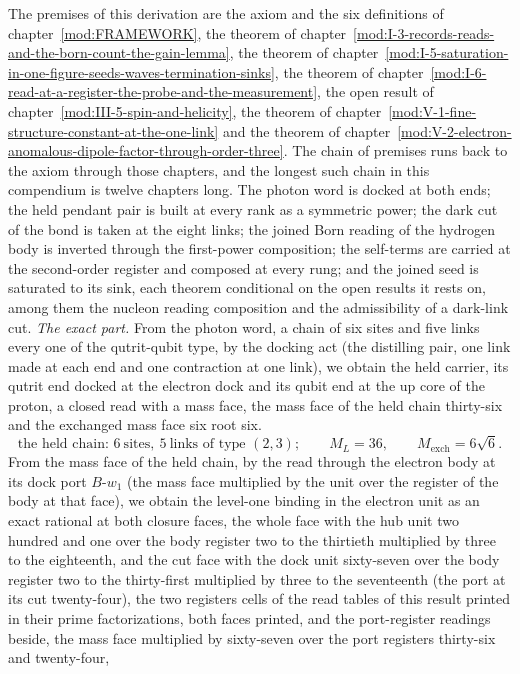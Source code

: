 \begin{chproof}
The premises of this derivation are the axiom and the six definitions of chapter~\ref{mod:FRAMEWORK}, the theorem of chapter~\ref{mod:I-3-records-reads-and-the-born-count-the-gain-lemma}, the theorem of chapter~\ref{mod:I-5-saturation-in-one-figure-seeds-waves-termination-sinks}, the theorem of chapter~\ref{mod:I-6-read-at-a-register-the-probe-and-the-measurement}, the open result of chapter~\ref{mod:III-5-spin-and-helicity}, the theorem of chapter~\ref{mod:V-1-fine-structure-constant-at-the-one-link} and the theorem of chapter~\ref{mod:V-2-electron-anomalous-dipole-factor-through-order-three}. The chain of premises runs back to the axiom through those chapters, and the longest such chain in this compendium is twelve chapters long.
The photon word is docked at both ends; the held pendant pair is built at every rank as a symmetric power; the dark cut of the bond is taken at the eight links; the joined Born reading of the hydrogen body is inverted through the first-power composition; the self-terms are carried at the second-order register and composed at every rung; and the joined seed is saturated to its sink, each theorem conditional on the open results it rests on, among them the nucleon reading composition and the admissibility of a dark-link cut.
\textit{The exact part.}
From the photon word, a chain of six sites and five links every one of the qutrit-qubit type, by the docking act (the distilling pair, one link made at each end and one contraction at one link), we obtain the held carrier, its qutrit end docked at the electron dock and its qubit end at the up core of the proton, a closed read with a mass face, the mass face of the held chain thirty-six and the exchanged mass face six root six.
\begin{equation}
\text{the held chain: } 6 \ \text{sites}, \ 5 \ \text{links of type } (2,3); \qquad M_{L} = 36, \qquad M_{\mathrm{exch}} = 6\sqrt{6} .
\end{equation}
From the mass face of the held chain, by the read through the electron body at its dock port $B$-$w_{1}$ (the mass face multiplied by the unit over the register of the body at that face), we obtain the level-one binding in the electron unit as an exact rational at both closure faces, the whole face with the hub unit two hundred and one over the body register two to the thirtieth multiplied by three to the eighteenth, and the cut face with the dock unit sixty-seven over the body register two to the thirty-first multiplied by three to the seventeenth (the port at its cut twenty-four), the two registers cells of the read tables of this result printed in their prime factorizations, both faces printed, and the port-register readings beside, the mass face multiplied by sixty-seven over the port registers thirty-six and twenty-four,

\end{chproof}
